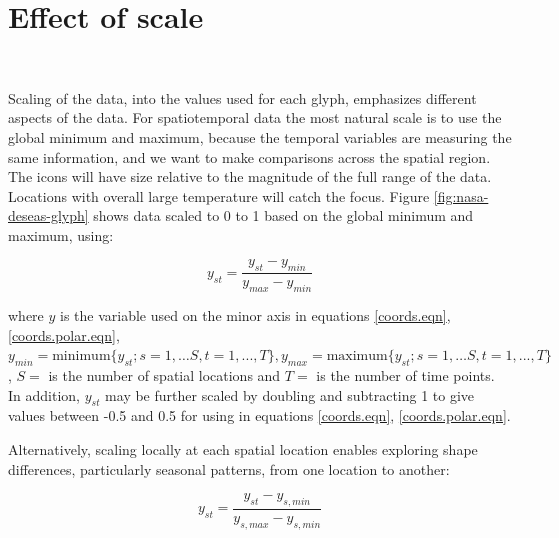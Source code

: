 \documentclass[oneside]{article}
\begin{document}
\section{Effect of scale}~\label{sec:scale}


Scaling of the data, into the values used for each glyph, emphasizes different aspects of the data. For spatiotemporal data the most natural scale is to use the global minimum and maximum, because the temporal variables are measuring the same information, and we want to make comparisons across the spatial region. The icons will have size relative to the magnitude of the full range of the data. Locations with overall large temperature will catch the focus. Figure \ref{fig:nasa-deseas-glyph} shows data scaled to 0 to 1 based on the global minimum and maximum, using:

\begin{equation}
y_{st} = \frac{y_{st}-y_{min}}{y_{max}-y_{min}} %
\label{scale1}
\end{equation}

\noindent where $y$ is the variable used on the minor axis in equations \ref{coords.eqn}, \ref{coords.polar.eqn}, $y_{min} = \mbox{minimum}\{y_{st}; s=1, \dots S, t=1, ..., T \}, y_{max} = \mbox{maximum}\{y_{st}; s=1, \dots S, t=1, ..., T\}$, $S=$ is the number of spatial locations and $T=$ is the number of time points. In addition, $y_{st}$ may be further scaled by doubling and subtracting 1 to give values between -0.5 and 0.5 for using in equations \ref{coords.eqn}, \ref{coords.polar.eqn}.

Alternatively, scaling locally at each spatial location enables exploring shape differences, particularly seasonal patterns, from one location to another:

\begin{equation}
y_{st} = \frac{y_{st}-y_{s,min}}{y_{s,max}-y_{s,min}} %
\label{scale2}
\end{equation}
\end{document}
